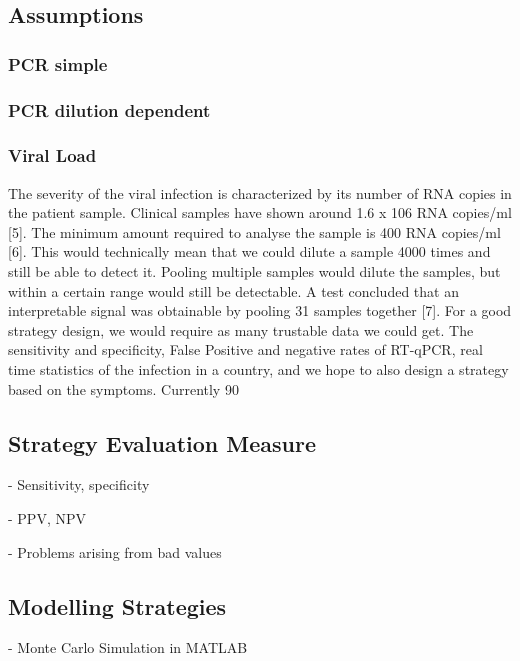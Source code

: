 \documentclass[fleqn,10pt]{wlscirep}
\begin{document}
\subsection{Assumptions}

\subsubsection{PCR simple}

\subsubsection{PCR dilution dependent}

\subsubsection{Viral Load}
The severity of the viral infection is characterized by its number of RNA copies in the patient sample. Clinical samples have shown around 1.6 x 106 RNA copies/ml [5]. The minimum amount required to analyse the sample is 400 RNA copies/ml [6]. This would technically mean that we could dilute a sample 4000 times and still be able to detect it. Pooling multiple samples would dilute the samples, but within a certain range would still be detectable. A test concluded that an interpretable signal was obtainable by pooling 31 samples together [7]. For a good strategy design, we would require as many trustable data we could get. The sensitivity and specificity, False Positive and negative rates of RT-qPCR, real time statistics of the infection in a country, and we hope to also design a strategy based on the symptoms. Currently 90%


\subsection{Strategy Evaluation Measure}
- Sensitivity, specificity

- PPV, NPV

- Problems arising from bad values

\subsection{Modelling Strategies}
- Monte Carlo Simulation in MATLAB 
\end{document}
